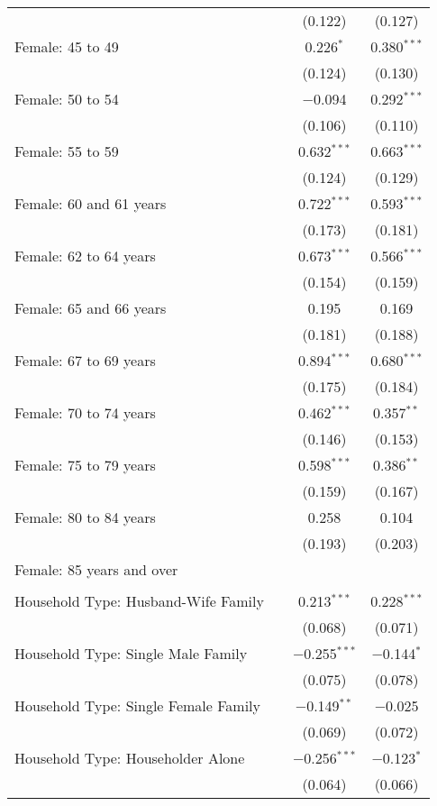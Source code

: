 \begin{longtable}{@{\extracolsep{5pt}}lccc}
  &  & (0.122) & (0.127) \\ 
  Female: 45 to 49 &  & 0.226$^{*}$ & 0.380$^{***}$ \\ 
  &  & (0.124) & (0.130) \\ 
  Female: 50 to 54 &  & $-$0.094 & 0.292$^{***}$ \\ 
  &  & (0.106) & (0.110) \\ 
  Female: 55 to 59 &  & 0.632$^{***}$ & 0.663$^{***}$ \\ 
  &  & (0.124) & (0.129) \\ 
  Female: 60 and 61 years &  & 0.722$^{***}$ & 0.593$^{***}$ \\ 
  &  & (0.173) & (0.181) \\ 
  Female: 62 to 64 years &  & 0.673$^{***}$ & 0.566$^{***}$ \\ 
  &  & (0.154) & (0.159) \\ 
  Female: 65 and 66 years &  & 0.195 & 0.169 \\ 
  &  & (0.181) & (0.188) \\ 
  Female: 67 to 69 years &  & 0.894$^{***}$ & 0.680$^{***}$ \\ 
  &  & (0.175) & (0.184) \\ 
  Female: 70 to 74 years &  & 0.462$^{***}$ & 0.357$^{**}$ \\ 
  &  & (0.146) & (0.153) \\ 
  Female: 75 to 79 years &  & 0.598$^{***}$ & 0.386$^{**}$ \\ 
  &  & (0.159) & (0.167) \\ 
  Female: 80 to 84 years &  & 0.258 & 0.104 \\ 
  &  & (0.193) & (0.203) \\ 
  Female: 85 years and over &  &  &  \\ 
  &  &  &  \\ 
  Household Type: Husband-Wife Family &  & 0.213$^{***}$ & 0.228$^{***}$ \\ 
  &  & (0.068) & (0.071) \\ 
  Household Type: Single Male Family &  & $-$0.255$^{***}$ & $-$0.144$^{*}$ \\ 
  &  & (0.075) & (0.078) \\ 
  Household Type: Single Female Family &  & $-$0.149$^{**}$ & $-$0.025 \\ 
  &  & (0.069) & (0.072) \\ 
  Household Type: Householder Alone &  & $-$0.256$^{***}$ & $-$0.123$^{*}$ \\ 
  &  & (0.064) & (0.066) \\ 

\end{longtable}
